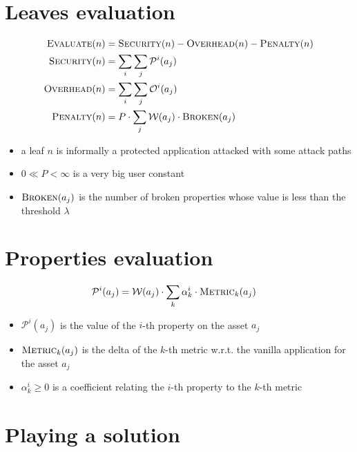 \documentclass[9pt]{scrartcl}
\newcommand{\Property}[2]{\mathcal{P}^{#1}(#2)}
\newcommand{\Overheadd}[2]{\mathcal{O}^{#1}(#2)}
\newcommand{\Weight}[1]{\mathcal{W}(#1)}
\newcommand{\Threshold}{\lambda}
\newcommand{\PenaltyValue}{P}
\newcommand{\MetricCoefficient}[2]{\alpha_{#1}^{#2}}
\newcommand{\Evaluate}[1]{\textsc{Evaluate}(#1)}
\newcommand{\Security}[1]{\textsc{Security}(#1)}
\newcommand{\Overhead}[1]{\textsc{Overhead}(#1)}
\newcommand{\Penalty}[1]{\textsc{Penalty}(#1)}
\newcommand{\Broken}[1]{\textsc{Broken}(#1)}
\newcommand{\Metric}[2]{\textsc{Metric}_{#1}(#2)}
\begin{document}
\section*{Leaves evaluation}

\begin{align*}
	\Evaluate{n} & = \Security{n} - \Overhead{n} - \Penalty{n}\\
	\Security{n} & = \sum_i \sum_j \Property{i}{a_j}\\
	\Overhead{n} & = \sum_i \sum_j \Overheadd{i}{a_j}\\
	\Penalty{n} & = \PenaltyValue \cdot \sum_j \Weight{a_j} \cdot \Broken{a_j}
\end{align*}

\begin{itemize}
	\item a leaf $n$ is informally a protected application attacked with some attack paths
	\item $0 \ll \PenaltyValue < \infty$ is a very big user constant
	\item $\Broken{a_j}$ is the number of broken properties whose value is less than the threshold $\Threshold$
\end{itemize}

\section*{Properties evaluation}

\begin{align*}
	\Property{i}{a_j} & = \Weight{a_j} \cdot \sum_k \MetricCoefficient{k}{i} \cdot \Metric{k}{a_j}
\end{align*}

\begin{itemize}
	\item $\Property{i}{a_j}$ is the value of the $i$-th property on the asset $a_j$
	\item $\Metric{k}{a_j}$ is the delta of the $k$-th metric w.r.t. the vanilla application for the asset $a_j$
	\item $\MetricCoefficient{k}{i} \ge 0$ is a coefficient relating the $i$-th property to the $k$-th metric
\end{itemize}

\newpage

\section*{Playing a solution}
\end{document}
